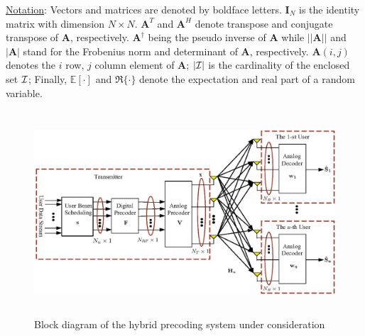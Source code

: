 \documentclass[conference]{IEEEtran}
\begin{document}

\underline{Notation}: Vectors and matrices are denoted by boldface letters. $\bm{I}_N$ is the identity matrix with dimension $N\times N$. ${\bm A}^T$ and ${\bm A}^H$ denote transpose and conjugate transpose of ${\bm A}$, respectively. $\bm{A}^\dagger$ being the pseudo inverse of $\bm{A}$ while $||\bm{A}|| $ and $|\bm{A}|$ stand for the Frobenius norm and determinant of ${\bm A}$, respectively. $\bm{A}(i,j)$ denotes the $i$ row, $j$ column element of ${\bm A}$; $|\cal{I}|$ is the cardinality of the enclosed set ${\cal I}$; Finally, $\mathbb{E}[\cdot] $ and $\Re\{\cdot\}$ denote the expectation and real part of a random variable.

\begin{figure}[htpb]
	\centering
	\begin{minipage}[t]{0.7\linewidth}
		\includegraphics[width=5.6in,height=3in]{PPTFigure/BlockDiagonal.eps}
		\caption{Block diagram of the hybrid precoding system under consideration}\label{fig:BlockDiagram}
		\parbox{6.5cm}{\small \hspace{1.5cm} }
	\end{minipage}
\end{figure}
\end{document}
